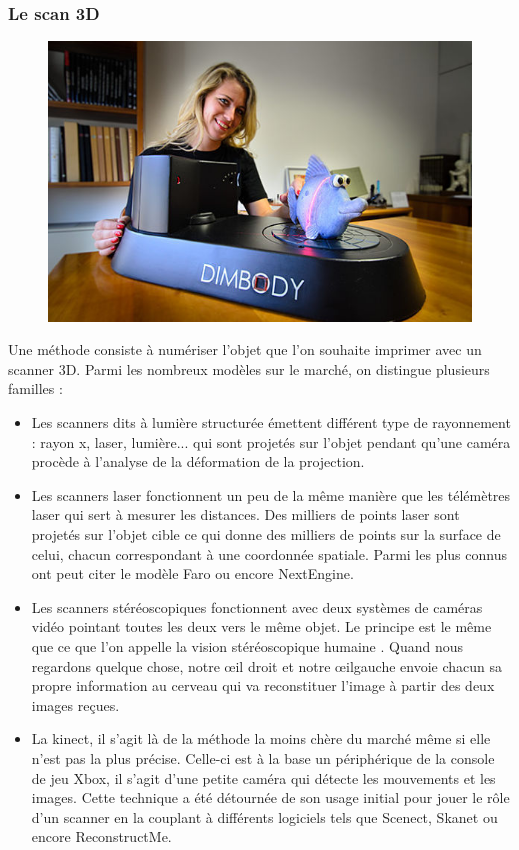 \documentclass{article}
\begin{document}
\subsubsection{Le scan 3D}
\begin{figure}[h!]
\centering
\includegraphics[scale=0.4]{./images/scanner-dimbody.png}
\end{figure}\hfill \break
Une méthode consiste à numériser l'objet que l'on souhaite imprimer avec un scanner 3D. Parmi les nombreux modèles sur le marché, on distingue plusieurs familles :
\begin{itemize}
\item Les scanners dits à lumière structurée émettent différent type de rayonnement : rayon x, laser, lumière... qui sont projetés sur l'objet pendant qu'une caméra procède à l'analyse de la déformation de la projection.
\item Les scanners laser fonctionnent un peu de la même manière que les télémètres laser qui sert à mesurer les distances. Des milliers de points laser sont projetés sur l'objet cible ce qui donne des milliers de points sur la surface de celui, chacun correspondant à une coordonnée spatiale. Parmi les plus connus ont peut citer le modèle Faro ou encore NextEngine.
\item Les scanners stéréoscopiques fonctionnent avec deux systèmes de caméras vidéo pointant toutes les deux vers le même objet. Le principe est le même que ce que l'on appelle la vision stéréoscopique humaine . Quand nous regardons quelque chose, notre œil droit et notre œilgauche envoie chacun sa propre information au cerveau qui va reconstituer l'image à partir des deux images reçues. 
\item La kinect, il s'agit là de la méthode la moins chère du marché même si elle n'est pas la plus précise. Celle-ci est à la base un périphérique de la console de jeu Xbox, il s'agit d'une petite caméra qui détecte les mouvements et les images. Cette technique a été détournée de son usage initial pour jouer le rôle d'un scanner en la couplant à différents logiciels tels que Scenect, Skanet ou encore ReconstructMe.
\end{itemize}
\end{document}
